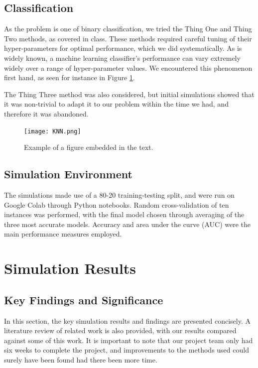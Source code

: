 \documentclass[12pt,a4paper]{article}
\begin{document}
	\subsection{Classification}
	As the problem is one of binary classification, we tried the Thing One and Thing Two methods, as covered in class. These methods required careful tuning of their hyper-parameters for optimal performance, which we did systematically. As is widely known, a machine learning classifier's performance can vary extremely widely over a range of hyper-parameter values. We encountered this phenomenon first hand, as seen for instance in Figure \ref{fig:one}.
	
	The Thing Three method was also considered, but initial simulations showed that it was non-trivial to adapt it to our problem within the time we had, and therefore it was abandoned.
	
	\begin{figure}
	\begin{center}
		\texttt{[image: KNN.png]}
	\end{center}
	\caption{Example of a figure embedded in the text.}
	\label{fig:one}
	\end{figure}
	
	\subsection{Simulation Environment}
	The simulations made use of a 80-20 training-testing split, and were run on Google Colab through Python notebooks. Random cross-validation of ten instances was performed, with the final model chosen through averaging of the three most accurate models. Accuracy and area under the curve (AUC) were the main performance measures employed.
	
	\section{Simulation Results}\label{sec:findings}
	\subsection{Key Findings and Significance}
	In this section, the key simulation results and findings are presented concisely. A literature review of related work is also provided, with our results compared against some of this work. It is important to note that our project team only had six weeks to complete the project, and improvements to the methods used could surely have been found had there been more time.
	
\end{document}
